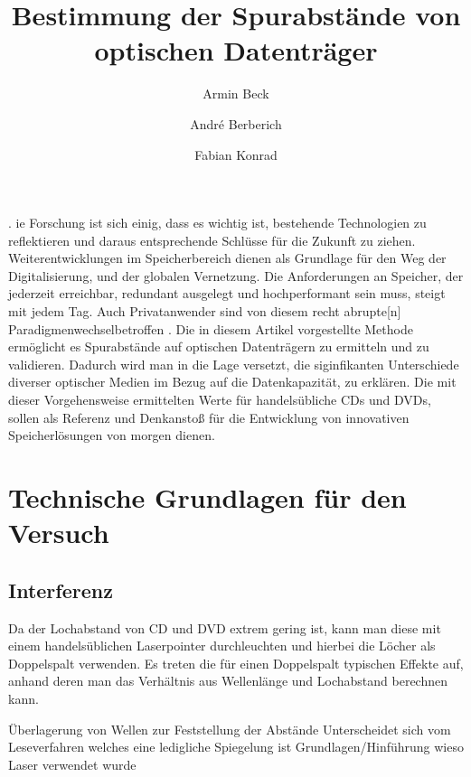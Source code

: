 \documentclass[9pt,twocolumn,twoside]{pnas-new}
\title{Bestimmung der Spurabstände von optischen Datenträger}
\author[a]{Armin Beck}
\author[a]{André Berberich}
\author[a]{Fabian Konrad}
\affil[a]{Student der DHBW Mosbach}
\begin{document}
\verticaladjustment{-2pt}

\maketitle
\thispagestyle{firststyle}
.
ie Forschung ist sich einig, dass es wichtig ist, bestehende Technologien zu reflektieren und daraus entsprechende Schlüsse für die Zukunft zu ziehen. Weiterentwicklungen im Speicherbereich dienen als Grundlage für den Weg der Digitalisierung, und der globalen Vernetzung. 
Die Anforderungen an Speicher, der jederzeit erreichbar, redundant ausgelegt und hochperformant sein muss, steigt mit jedem Tag.
Auch Privatanwender sind von diesem \glqq recht abrupte[n] Paradigmenwechsel\grqq \space betroffen \cite[Heft 10/2012 S.102]{CT1990}.
Die in diesem Artikel vorgestellte Methode ermöglicht es Spurabstände auf optischen Datenträgern zu ermitteln und zu validieren. Dadurch wird man in die Lage versetzt, die siginfikanten Unterschiede diverser optischer Medien im Bezug auf die Datenkapazität, zu erklären.
Die mit dieser Vorgehensweise ermittelten Werte für handelsübliche CDs und DVDs, sollen als Referenz und Denkanstoß für die Entwicklung von innovativen Speicherlösungen von morgen dienen.

\section*{Technische Grundlagen für den Versuch}

\subsection*{Interferenz}

 Da der Lochabstand von CD und DVD extrem gering ist, kann man diese mit einem handelsüblichen Laserpointer durchleuchten und hierbei die Löcher als Doppelspalt verwenden. Es treten die für einen Doppelspalt typischen Effekte auf, anhand deren man das Verhältnis aus Wellenlänge und Lochabstand berechnen kann.

Überlagerung von Wellen zur Feststellung der Abstände
Unterscheidet sich vom Leseverfahren welches eine ledigliche Spiegelung ist
Grundlagen/Hinführung wieso Laser verwendet wurde
\end{document}
